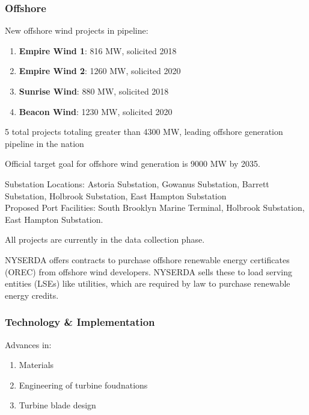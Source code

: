 \documentclass[plain]{article}
\newcommand{\1}{\mathbbm{1}}
\begin{document}
\subsubsection{Offshore}
New offshore wind projects in pipeline:
\begin{enumerate}
	\item \textbf{Empire Wind 1}: 816 MW, solicited 2018 \cite{noauthor_new_nodate-1}
	\item 	\textbf{Empire Wind 2}: 1260 MW, solicited 2020 \cite{noauthor_new_nodate-1}
	\item \textbf{Sunrise Wind}: 880 MW, solicited 2018 \cite{noauthor_new_nodate-1}
	\item \textbf{Beacon Wind}: 1230 MW, solicited 2020 \cite{noauthor_new_nodate-1}
\end{enumerate}

5 total projects totaling greater than 4300 MW, leading offshore generation pipeline in the nation

Official target goal for offshore wind generation is 9000 MW by 2035. \cite{noauthor_us_nodate-1}

Substation Locations: Astoria Substation, Gowanus Substation, Barrett Substation, Holbrook Substation, East Hampton Substation\\
Proposed Port Facilities: South Brooklyn Marine Terminal, Holbrook Substation, East Hampton Substation. \cite{noauthor_new_nodate-1}

All projects are currently in the data collection phase. \cite{noauthor_new_nodate-1}

NYSERDA offers contracts to purchase offshore renewable energy certificates (OREC) from offshore wind developers. NYSERDA sells these to load serving entities (LSEs) like utilities, which are required by law to purchase renewable energy credits. \cite{NYSERDA_new_nodate-1}

\subsubsection{Technology \& Implementation}
Advances in:
\begin{enumerate}
	\item Materials
	\item Engineering of turbine foudnations
	\item Turbine blade design
\end{enumerate}
\end{document}

